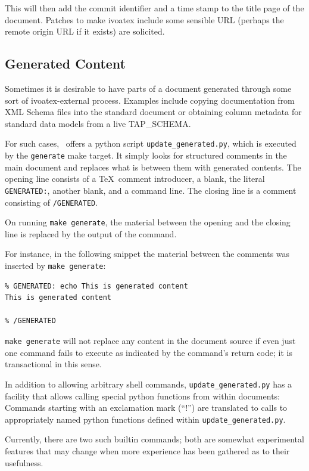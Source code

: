 \documentclass[11pt,a4paper]{ivoa}
\begin{document}
This will then add the commit identifier and a time stamp to the title
page of the document.  Patches to make ivoatex include some sensible URL
(perhaps the remote origin URL if it exists) are solicited.


\subsection{Generated Content}
\label{sect:generated}

Sometimes it is desirable to have parts of a document generated through
some sort of ivoatex-external process.  Examples include copying
documentation from XML Schema files into the standard document 
or obtaining column metadata for standard
data models from a live TAP\_SCHEMA.

For such cases, \ivoatex\ offers a python script
\texttt{update\_generated.py}, which is executed by the
\texttt{generate} make target.  It simply looks for structured comments
in the main document and replaces what is between them with generated
contents.  The opening line consists of a \TeX~comment introducer, a
blank, the literal \texttt{GENERATED:}, another blank, and a command
line.  The closing line is a comment consisting of \texttt{/GENERATED}.

On running \texttt{make generate}, the material between the opening and
the closing line is replaced by the output of the command.

For instance, in the following snippet the material between the comments
was inserted by \texttt{make generate}:

\begin{lstlisting}
% GENERATED: echo This is generated content
This is generated content

% /GENERATED
\end{lstlisting}

\texttt{make generate} will not replace any content in the document source
if even just one command fails to execute as indicated by the
command's return code; it is transactional in this sense.

In addition to allowing arbitrary shell
commands, \texttt{update\_generated.py} has a facility that allows
calling special python functions from within documents: Commands
starting with an exclamation mark (``!'') are translated to calls to
appropriately named python functions defined within
\texttt{update\_generated.py}.

Currently, there are two such builtin commands; both are somewhat
experimental features that may change when more experience has been
gathered as to their usefulness.
\end{document}

